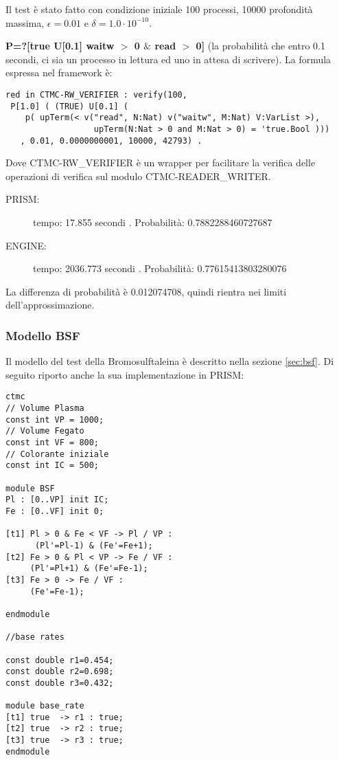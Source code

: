 Il test è stato fatto con condizione iniziale 100 processi, 10000 profondità
massima, $\epsilon = 0.01$ e $\delta = 1.0\cdot10^{-10}$.

\textbf{P=?[true U[0.1] waitw $>$ 0 $\&$ read $>$ 0]} (la probabilità che entro
0.1 secondi, ci sia un processo in lettura ed uno in attesa di scrivere).
La formula espressa nel framework è:
\begin{Verbatim}
red in CTMC-RW_VERIFIER : verify(100,
 P[1.0] ( (TRUE) U[0.1] ( 
    p( upTerm(< v("read", N:Nat) v("waitw", M:Nat) V:VarList >),
                  upTerm(N:Nat > 0 and M:Nat > 0) = 'true.Bool )))
   , 0.01, 0.0000000001, 10000, 42793) .
\end{Verbatim}
Dove CTMC-RW\_VERIFIER è un wrapper per facilitare la verifica delle operazioni
di verifica sul modulo CTMC-READER\_WRITER.

\begin{description}
	\item[PRISM:] tempo: 17.855 secondi . Probabilità: 0.7882288460727687
	\item[ENGINE:] tempo: 2036.773 secondi . Probabilità: 0.77615413803280076
\end{description}

La differenza di probabilità è 0.012074708, quindi rientra nei limiti
dell'approssimazione.

\subsubsection{Modello BSF}

Il modello del test della Bromosulftaleina è descritto nella sezione
\ref{sec:bsf}. Di seguito riporto anche la sua implementazione in PRISM:
\begin{Verbatim}[fontsize=\small]
ctmc
// Volume Plasma
const int VP = 1000;
// Volume Fegato
const int VF = 800;
// Colorante iniziale
const int IC = 500;

module BSF
Pl : [0..VP] init IC;
Fe : [0..VF] init 0;

[t1] Pl > 0 & Fe < VF -> Pl / VP :
      (Pl'=Pl-1) & (Fe'=Fe+1);
[t2] Fe > 0 & Pl < VP -> Fe / VF :
     (Pl'=Pl+1) & (Fe'=Fe-1);
[t3] Fe > 0 -> Fe / VF :
     (Fe'=Fe-1);

endmodule

//base rates

const double r1=0.454;
const double r2=0.698;
const double r3=0.432;

module base_rate 
[t1] true  -> r1 : true;
[t2] true  -> r2 : true;
[t3] true  -> r3 : true;
endmodule
\end{Verbatim}


